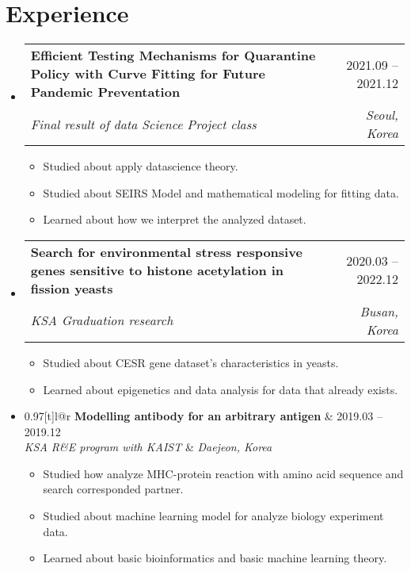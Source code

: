 \documentclass[letterpaper,11pt]{article}
\makeatletter
\newcommand{\resumeItem}[1]{
  \item{
    {#1 \vspace{-4pt}}
  }
}
\newcommand{\resumeSubheading}[4]{
  \vspace{-2pt}\item
    \begin{tabular*}{0.97\textwidth}[t]{l@{\extracolsep{\fill}}r}
      \textbf{#1} & #2 \\
      \textit{\small #3} & \textit{\small #4} \\
    \end{tabular*}\vspace{-10pt}
}
\newcommand{\resumeSubHeadingListStart}{\begin{itemize}[leftmargin=0.15in, label={}]}
\newcommand{\resumeSubHeadingListEnd}{\end{itemize}}
\newcommand{\resumeItemListStart}{\begin{itemize}}
\newcommand{\resumeItemListEnd}{\end{itemize}\vspace{-2pt}}
\makeatother
\begin{document}

\section{Experience}
\resumeSubHeadingListStart

    \resumeSubheading
      {Efficient Testing Mechanisms for Quarantine Policy with Curve Fitting for Future Pandemic Preventation}{2021.09 -- 2021.12}
      {Final result of data Science Project class}{Seoul, Korea}
      \resumeItemListStart
        \small\resumeItem{Studied about apply datascience theory.}
        \resumeItem{Studied about SEIRS Model and mathematical modeling for fitting data.}
        \resumeItem{Learned about how we interpret the analyzed dataset.}
        \resumeItemListEnd
    
    \resumeSubheading
      {Search for environmental stress responsive genes sensitive to histone acetylation in fission yeasts}{2020.03 -- 2022.12}
      {KSA Graduation research}{Busan, Korea}
      \resumeItemListStart
        \small\resumeItem{Studied about CESR gene dataset's characteristics in yeasts.}
        \resumeItem{Learned about epigenetics and data analysis for data that already exists.}
        \resumeItemListEnd

    \resumeSubheading
      {Modelling antibody for an arbitrary antigen}{2019.03 -- 2019.12}
      {KSA R&E program with KAIST}{Daejeon, Korea}
      \resumeItemListStart
        \small\resumeItem{Studied how analyze MHC-protein reaction with amino acid sequence and search corresponded partner.}
        \resumeItem{Studied about machine learning model for analyze biology experiment data.}
        \resumeItem{Learned about basic bioinformatics and basic machine learning theory.}
        \resumeItemListEnd

\resumeSubHeadingListEnd
\end{document}
